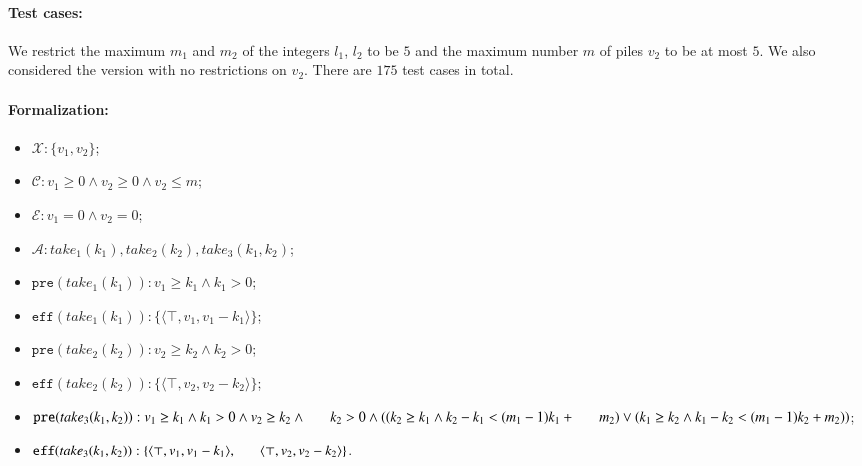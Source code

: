 \documentclass[review]{elsarticle}
\newcommand{\set}[1]{\{ #1 \}}
\newcommand{\tuple}[1]{\langle {#1} \rangle}
\newcommand{\true}{\top}
\newcommand{\statevar}{\mathcal{X}}
\newcommand{\act}{\mathcal{A}}
\newcommand{\constraint}{\mathcal{C}}
\newcommand{\estate}{\mathcal{E}}
\newcommand{\pre}{\mathtt{pre}}
\newcommand{\eff}{\mathtt{eff}}
\begin{document}
\paragraph{Test cases:}
We restrict the maximum $m_1$ and $m_2$ of the integers $l_1$, $l_2$ to be $5$ and the maximum number $m$ of piles $v_2$ to be at most $5$.
We also considered the version with no restrictions on $v_2$.
There are $175$ test cases in total.

\paragraph{Formalization:}
\begin{itemize}
	\item $\statevar:\set{v_1, v_2}$;
	\item $\constraint: v_1 \ge 0 \wedge v_2 \ge 0 \wedge v_2 \le m$;
	\item $\estate: v_1 = 0 \wedge v_2 = 0$;
	\item $\act:take_1(k_1), take_2(k_2), take_3(k_1,k_2)$;
	\item $\pre(take_1(k_1)) : v_1 \ge k_1 \wedge  k_1 > 0 $;
	\item $\eff(take_1(k_1)) : \set{\tuple{\true, v_1, v_1-k_1}}$;
	\item $\pre(take_2(k_2)) : v_2 \ge k_2 \wedge  k_2 > 0 $;
	\item $\eff(take_2(k_2)) : \set{\tuple{\true, v_2, v_2-k_2}}$;
	\item $\pre(take_3(k_1, k_2)) : v_1 \ge k_1 \wedge  k_1 > 0 \wedge v_2 \ge k_2 \wedge \\ \hspace*{6mm}
	k_2 > 0  \wedge ((k_2 \ge k_1  \wedge k_2-k_1 < (m_1 - 1)k_1 + \\ \hspace*{6mm}
	m_2) \vee(k_1 \ge k_2 \wedge k_1-k_2 < (m_1 - 1)k_2 + m_2))$;
	\item $\eff(take_3(k_1, k_2)) : \set{\tuple{\true, v_1, v_1 -k_1}, \\ \hspace*{6mm}
		\tuple{\true, v_2, v_2 - k_2}}$.
\end{itemize}
\end{document}
